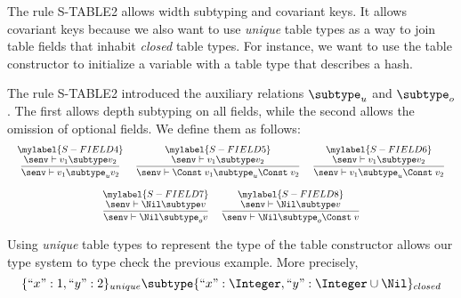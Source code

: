The rule \textsc{S-TABLE2} allows width subtyping and covariant keys.
It allows covariant keys because we also want to use \emph{unique}
table types as a way to join table fields that inhabit \emph{closed} table types.
For instance, we want to use the table constructor to initialize
a variable with a table type that describes a hash.

The rule \textsc{S-TABLE2} introduced the auxiliary relations
$\subtype_{u}$ and $\subtype_{o}$.
The first allows depth subtyping on all fields,
while the second allows the omission of optional fields.
We define them as follows:
\[
\begin{array}{c}
\begin{array}{c}
\mylabel{S-FIELD4}\\
\dfrac{\senv \vdash v_{1} \subtype v_{2}}
      {\senv \vdash v_{1} \subtype_{u} v_{2}}
\end{array}
\;
\begin{array}{c}
\mylabel{S-FIELD5}\\
\dfrac{\senv \vdash v_{1} \subtype v_{2}}
      {\senv \vdash \Const \; v_{1} \subtype_{u} \Const \; v_{2}}
\end{array}
\;
\begin{array}{c}
\mylabel{S-FIELD6}\\
\dfrac{\senv \vdash v_{1} \subtype v_{2}}
      {\senv \vdash v_{1} \subtype_{u} \Const \; v_{2}}
\end{array}
\\ \\
\begin{array}{c}
\mylabel{S-FIELD7}\\
\dfrac{\senv \vdash \Nil \subtype v}
      {\senv \vdash \Nil \subtype_{o} v}
\end{array}
\;
\begin{array}{c}
\mylabel{S-FIELD8}\\
\dfrac{\senv \vdash \Nil \subtype v}
      {\senv \vdash \Nil \subtype_{o} \Const \; v}
\end{array}
\end{array}
\]

Using \emph{unique} table types to represent the type of the table
constructor allows our type system to type check the previous example.
More precisely,
\[
\{``x":1, ``y":2\}_{unique} \subtype \{``x":\Integer, ``y":\Integer \cup \Nil\}_{closed}
\]

